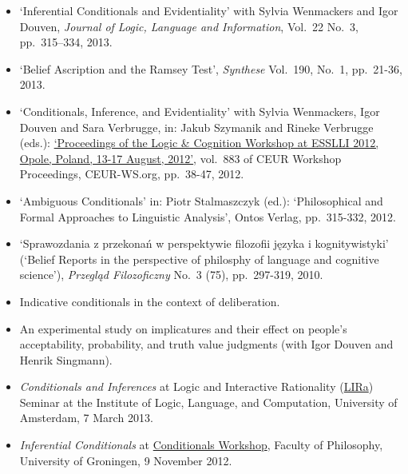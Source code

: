 \documentclass[a4paper,12pt]{article}
\begin{document}
\begin{small}
\begin{itemize}
   \item `Inferential Conditionals and Evidentiality' with Sylvia
    Wenmackers and Igor Douven, \emph{Journal of Logic, Language and Information}, Vol.~22 No.~3, pp.~315–334, 2013.

  \item `Belief Ascription and the Ramsey Test', \emph{Synthese}
    Vol.~190, No.~1, pp.~21-36, 2013. %

  \item `Conditionals, Inference, and Evidentiality' with Sylvia
    Wenmackers, Igor Douven and Sara Verbrugge, in: Jakub Szymanik and
    Rineke Verbrugge (eds.):
    \href{http://ceur-ws.org/Vol-883/}{`Proceedings of the Logic \&
      Cognition Workshop at ESSLLI 2012, Opole, Poland, 13-17 August,
      2012'}, vol.~883 of CEUR Workshop Proceedings, CEUR-WS.org,
    pp.~38-47, 2012.

  \item `Ambiguous Conditionals' in: Piotr Stalmaszczyk (ed.):
    `Philosophical and Formal Approaches to Linguistic Analysis',
    Ontos Verlag, pp.~315-332, 2012.

  \item `Sprawozdania z przekonań w perspektywie filozofii języka i
    kognitywistyki' (`Belief Reports in the perspective of philosphy
    of language and cognitive science'), \emph{Przegląd Filozoficzny}
    No.~3 (75), pp.~297-319, 2010.

  \end{itemize}

  \begin{itemize}
   \item Indicative conditionals in the context of deliberation.
   \item An experimental study on implicatures and their effect on people's acceptability, probability, and truth value judgments (with Igor Douven and Henrik Singmann).
  \end{itemize}
  

  \begin{itemize}
  \item \emph{Conditionals and Inferences} at Logic and Interactive
    Rationality (\href{http://www.illc.uva.nl/lgc/seminar/}{LIRa})
    Seminar at the Institute of Logic, Language, and Computation,
    University of Amsterdam, 7 March 2013.
  \item \emph{Inferential Conditionals} at
    \href{https://sites.google.com/site/jannekehuitink/workshop}{Conditionals
      Workshop}, Faculty of Philosophy, University of Groningen, 9
    November 2012.
  \end{itemize}
  

\end{small}
\end{document}
